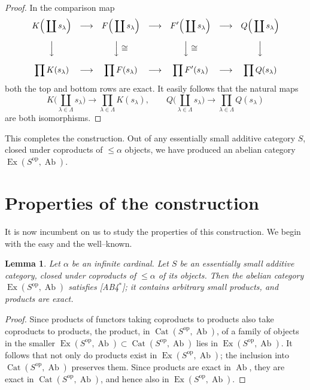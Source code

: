 \documentclass[11pt,a4paper]{article}
\theoremstyle{plain}
\newtheorem{lemma}[theorem]{Lemma}
\theoremstyle{definition}
\DeclareMathOperator{\Cat}{Cat}
\DeclareMathOperator{\Ex}{Ex}
\DeclareMathOperator{\Ab}{Ab}
\newcommand{\op}{\mathrm{op}}
\numberwithin{equation}{section}
\begin{document}
\begin{proof}
In the comparison map
\begin{equation*}
\begin{array}{ccccccccc}
\displaystyle K\Big(\coprod s_{\lambda}\Big) & \longrightarrow & \displaystyle F\Big(\coprod s_{\lambda}\Big) & \longrightarrow & \displaystyle F'\Big(\coprod s_{\lambda}\Big) & \longrightarrow & \displaystyle Q\Big(\coprod s_{\lambda}\Big) \\[12pt]
\Big\downarrow & & \Big\downarrow\cong & & \Big\downarrow\cong & & \Big\downarrow \\[12pt]
\displaystyle \prod K(s_{\lambda}) & \longrightarrow & \displaystyle \prod F(s_{\lambda}) & \longrightarrow & \displaystyle \prod F'(s_{\lambda}) & \longrightarrow & \displaystyle \prod Q(s_{\lambda})
\end{array}
\end{equation*}
both the top and bottom rows are exact. It easily follows that the natural maps
\begin{equation*}
K\Big(\coprod_{\lambda\in\Lambda} s_{\lambda}\Big) \longrightarrow \prod_{\lambda\in\Lambda} K(s_{\lambda}), \qquad
Q\Big(\coprod_{\lambda\in\Lambda} s_{\lambda}\Big) \longrightarrow \prod_{\lambda\in\Lambda} Q(s_{\lambda})
\end{equation*}
are both isomorphisms. \qedhere
\end{proof}

This completes the construction. Out of any essentially small additive category $S$, closed under coproducts of $\leq\alpha$ objects, we have produced an abelian category $\Ex(S^{\op},\Ab)$.


\section{Properties of the construction}

It is now incumbent on us to study the properties of this construction. We begin with the easy and the well--known.

\begin{lemma}\label{lem2.1}
Let $\alpha$ be an infinite cardinal. Let $S$ be an essentially small additive category, closed under coproducts of $\leq\alpha$ of its objects. Then the abelian category $\Ex(S^{\op},\Ab)$ satisfies [AB4$^{*}$]; it contains arbitrary small products, and products are exact.
\end{lemma}

\begin{proof}
Since products of functors taking coproducts to products also take coproducts to products, the product, in $\Cat(S^{\op},\Ab)$, of a family of objects in the smaller $\Ex(S^{\op},\Ab) \subset \Cat(S^{\op},\Ab)$ lies in $\Ex(S^{\op},\Ab)$. It follows that not only do products exist in $\Ex(S^{\op},\Ab)$; the inclusion into $\Cat(S^{\op},\Ab)$ preserves them. Since products are exact in $\Ab$, they are exact in $\Cat(S^{\op},\Ab)$, and hence also in $\Ex(S^{\op},\Ab)$.
\end{proof}
\end{document}
